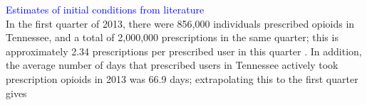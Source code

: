 \documentclass[12pt]{article}
\begin{document}
\textcolor{blue}{Estimates of initial conditions from literature} \\


In the first quarter of 2013, there were 856,000 individuals prescribed opioids in Tennessee, and a total of 2,000,000 prescriptions in the same quarter; this is approximately 2.34 prescriptions per prescribed user in this quarter \cite{PDO}. In addition, the average number of days that prescribed users in Tennessee actively took prescription opioids in 2013 was 66.9 days; extrapolating this to the first quarter gives 
\end{document}
